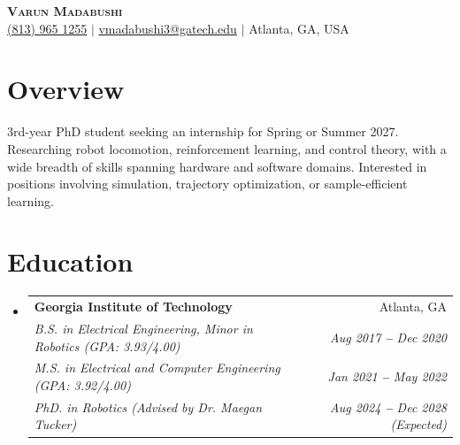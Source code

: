 \documentclass[letterpaper,11pt]{article}
\makeatletter
\newcommand{\resumeEducationHeading}[8]{
  \vspace{-2pt}\item
    \begin{tabular*}{0.97\textwidth}[t]{l@{\extracolsep{\fill}}r}
      \textbf{#1} & #2 \\
      \textit{\small#3} & \textit{\small #4} \\
      \textit{\small#5} & \textit{\small #6} \\
      \textit{\small#7} & \textit{\small #8} \\
    \end{tabular*}\vspace{-5pt}
}
\newcommand{\resumeSubHeadingListStart}{\begin{itemize}[leftmargin=0.15in, label={}]}
\newcommand{\resumeSubHeadingListEnd}{\end{itemize}}
\makeatother
\begin{document}

\begin{center}
    \textbf{\Huge \scshape Varun Madabushi } \\ \vspace{3pt}
    \small
    \faMobile \hspace{.5pt} \href{tel:+18139651255}{(813) 965 1255}
    $|$
    \faAt \hspace{.5pt}
    \href{mailto:vmadabushi3@gatech.edu}{vmadabushi3@gatech.edu}
    $|$
    \faMapMarker \hspace{.5pt} {Atlanta, GA, USA}
\end{center}



\section{Overview}
  3rd-year PhD student seeking an internship for Spring or Summer 2027. Researching robot locomotion, reinforcement learning, and control theory, with a wide breadth of skills spanning hardware and software domains.
  Interested in positions involving simulation, trajectory optimization, or sample-efficient learning.

\section{Education}
  \vspace{3pt}
  \resumeSubHeadingListStart
    
    \resumeEducationHeading
      {Georgia Institute of Technology}{Atlanta, GA}
      {B.S. in Electrical Engineering, Minor in Robotics (GPA: 3.93/4.00)   }{Aug 2017 \textbf{--} Dec 2020}
      {M.S. in Electrical and Computer Engineering (GPA: 3.92/4.00)        }{Jan 2021 \textbf{--} May 2022}
      {PhD. in Robotics (Advised by Dr. Maegan Tucker)       }{Aug 2024 \textbf{--} Dec 2028 (Expected)}
  \resumeSubHeadingListEnd

\end{document}
